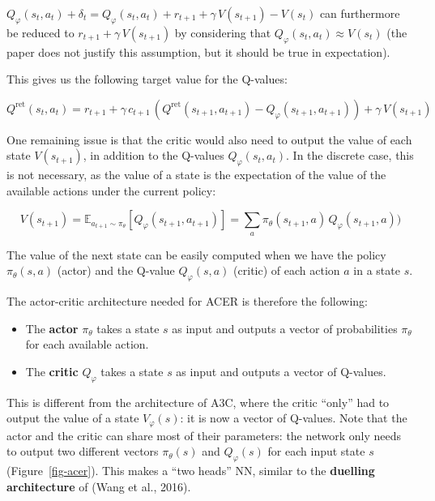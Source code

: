 \documentclass[
  letterpaper,
  DIV=11,
  numbers=noendperiod]{scrreprt}
\begin{document}
\(Q_\varphi(s_t, a_t) + \delta_t = Q_\varphi(s_t, a_t) + r_{t+1} + \gamma \, V(s_{t+1}) - V(s_t)\)
can furthermore be reduced to \(r_{t+1} + \gamma \, V(s_{t+1})\) by
considering that \(Q_\varphi(s_t, a_t) \approx V(s_t)\) (the paper does
not justify this assumption, but it should be true in expectation).

This gives us the following target value for the Q-values:

\[
    Q^\text{ret}(s_t, a_t) = r_{t+1} + \gamma \, c_{t+1} \, (Q^\text{ret}(s_{t+1}, a_{t+1}) - Q_\varphi(s_{t+1}, a_{t+1})) + \gamma \, V(s_{t+1})
\]

One remaining issue is that the critic would also need to output the
value of each state \(V(s_{t+1})\), in addition to the Q-values
\(Q_\varphi(s_t, a_t)\). In the discrete case, this is not necessary, as
the value of a state is the expectation of the value of the available
actions under the current policy:

\[
    V(s_{t+1}) = \mathbb{E}_{a_{t+1} \sim \pi_\theta} [Q_\varphi(s_{t+1}, a_{t+1})] = \sum_a \pi_\theta(s_{t+1}, a) \, Q_\varphi(s_{t+1}, a))
\]

The value of the next state can be easily computed when we have the
policy \(\pi_\theta(s, a)\) (actor) and the Q-value \(Q_\varphi(s, a)\)
(critic) of each action \(a\) in a state \(s\).

The actor-critic architecture needed for ACER is therefore the
following:

\begin{itemize}
\item
  The \textbf{actor} \(\pi_\theta\) takes a state \(s\) as input and
  outputs a vector of probabilities \(\pi_\theta\) for each available
  action.
\item
  The \textbf{critic} \(Q_\varphi\) takes a state \(s\) as input and
  outputs a vector of Q-values.
\end{itemize}

This is different from the architecture of A3C, where the critic
``only'' had to output the value of a state \(V_\varphi(s)\): it is now
a vector of Q-values. Note that the actor and the critic can share most
of their parameters: the network only needs to output two different
vectors \(\pi_\theta(s)\) and \(Q_\varphi(s)\) for each input state
\(s\) (Figure~\ref{fig-acer}). This makes a ``two heads'' NN, similar to
the \textbf{duelling architecture} of (Wang et al., 2016).
\end{document}
